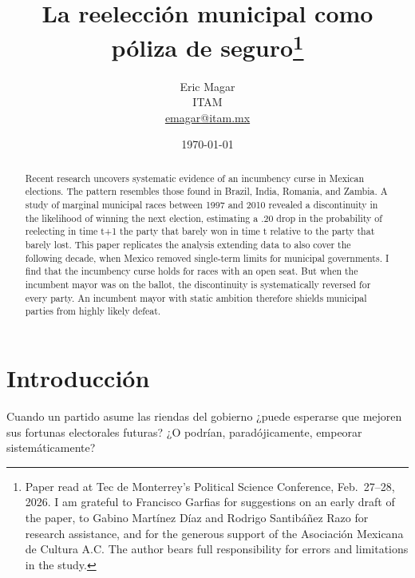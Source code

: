 \documentclass[letter,12pt]{article}
\begin{document}
\title{La reelección municipal como póliza de seguro\thanks{Paper read at Tec de Monterrey's Political Science Conference, Feb.\ 27--28, 2026. I am grateful to Francisco Garfias for suggestions on an early draft of the paper, to Gabino Martínez Díaz and Rodrigo Santibáñez Razo for research assistance, and for the generous support of the Asociación Mexicana de Cultura A.C. The author bears full responsibility for errors and limitations in the study.}}
\author{Eric Magar  \\ ITAM \\ \url{emagar@itam.mx}}
\date{\today}
\maketitle


\begin{abstract}
\noindent Recent research uncovers systematic evidence of an incumbency curse in Mexican elections. The pattern resembles those found in Brazil, India, Romania, and Zambia. A study of marginal municipal races between 1997 and 2010 revealed a discontinuity in the likelihood of winning the next election, estimating a .20 drop in the probability of reelecting in time t+1 the party that barely won in time t relative to the party that barely lost. This paper replicates the analysis extending data to also cover the following decade, when Mexico removed single-term limits for municipal governments. I find that the incumbency curse holds for races with an open seat. But when the incumbent mayor was on the ballot, the discontinuity is systematically reversed for every party. An incumbent mayor with static ambition therefore shields municipal parties from highly likely defeat.
\end{abstract}

\newpage 

\onehalfspacing

\section{Introducción}

\noindent Cuando un partido asume las riendas del gobierno ¿puede esperarse que mejoren sus fortunas electorales futuras? ¿O podrían, paradójicamente, empeorar sistemáticamente?
\end{document}
